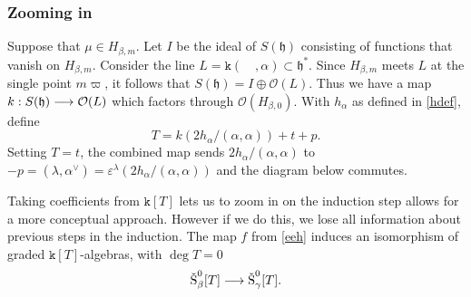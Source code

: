 \documentclass{article}
\newcommand{\ttk}{\mathtt{k}}
\newcommand{\noi}{\noindent}
\newcommand{\ga}{\alpha}
\newcommand{\gb}{\beta}
\newcommand{\gc}{\gamma}
\newcommand{\gl}{\lambda}
\newcommand{\op}{\oplus}
\newcommand{\fh}{\mathfrak{h}}
\newcommand{\cO}{\mathcal{O}}
\begin{document}
\subsubsection{Zooming in}  
\noi {}
Suppose that  $\mu \in H_{\gb,m}$. %
Let $I$ be the ideal of $S(\fh) $ consisting of functions that vanish on $ H_{\gb,m}$. Consider the line %
$L =\ttk (\quad , \alpha)\subset \fh^*$. Since $ H_{\gb,m}$ meets $L$ at the  single point $m\varpi$,  it follows that $S(\fh) = I\op \cO(L)$. 
Thus we have a map 
$k:S(\fh)  \lra \cO(L)$ which factors through $\cO( H_{\gb,0})$.  
With  $h_\alpha$ as defined in \eqref{hdef}, define $$T=k(2h_\ga/(\ga,\ga))+t+p.$$  Setting $T=t$,  the combined map sends $2h_\ga/(\ga,\ga)$ to $-p = (\gl,\ga^\vee) = \varepsilon^{\gl}(2h_\ga/(\ga,\ga))$ and the diagram below commutes.

\xymatrix{
&&&&\
\cO( H_{\gb,0})
 \ar@{->}[dr]_{\varepsilon^{\gl}}  \ar@{->}[rr]^{k}  && \ttk[T]
\ar@{->}^{T\lra t%
}[dl] &\\
&&&&&\ttk
} \noi
Taking  coefficients from $\ttk[T]$ lets us to zoom in on the induction step allows for a more conceptual approach.  However if we do this, we lose all information about previous steps in the induction. The map $f$ from \eqref{eeh} induces an isomorphism of graded $\ttk[T]$-algebras, with $\deg T =0$
$$\mbox{Š}_\gb^0[T] \lra \mbox{Š}_\gc^0[T].$$
\end{document}
